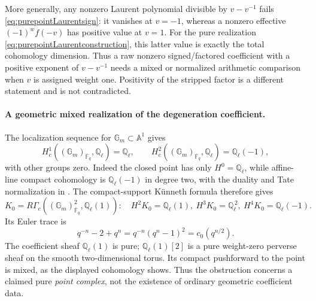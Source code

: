\documentclass[11pt,a4paper]{article}
\theoremstyle{named}\newtheorem{finding}{Finding}[section]
\theoremstyle{definition}\newtheorem{definition}[finding]{Definition}
\theoremstyle{remark}\newtheorem{remark}[finding]{Remark}
\begin{document}
More generally, any nonzero Laurent polynomial divisible by
\(v-v^{-1}\) fails \eqref{eq:purepointLaurentsign}:
it vanishes at \(v=-1\), whereas a nonzero effective
\((-1)^wf(-v)\) has positive value at \(v=1\).
For the pure realization
\eqref{eq:purepointLaurentconstruction}, this latter value
is exactly the total cohomology dimension.
Thus a raw nonzero signed/factored coefficient with a
positive exponent of \(v-v^{-1}\) needs a mixed or
normalized arithmetic comparison when \(v\) is assigned
weight one. Positivity of the stripped factor is a
different statement and is not contradicted.

\paragraph{A geometric mixed realization of the degeneration coefficient.}
The localization sequence for
\(\mathbb G_m\subset\mathbb A^1\)
\cite[Proposition~18.4(b), pp.~121--122]{Milne} gives
\[
 H_c^1((\mathbb G_m)_{\overline{\mathbb F}_q},
          \mathbb Q_\ell)=\mathbb Q_\ell,\qquad
 H_c^2((\mathbb G_m)_{\overline{\mathbb F}_q},
          \mathbb Q_\ell)=\mathbb Q_\ell(-1),
\]
with other groups zero. Indeed the closed point has
only \(H^0=\mathbb Q_\ell\), while affine-line compact
cohomology is \(\mathbb Q_\ell(-1)\) in degree two,
with the duality and Tate normalization in
\cite[Theorem~24.1(a),(b), p.~144]{Milne}.
The compact-support K\"unneth formula
\cite[Theorem~22.1 and Remark~22.3(b),
pp.~135--136]{Milne} therefore gives
\[
 K_0=R\Gamma_c((\mathbb G_m)^2_{\overline{\mathbb F}_q},
                   \mathbb Q_\ell(1)):
 \quad
 H^2K_0=\mathbb Q_\ell(1),\
 H^3K_0=\mathbb Q_\ell^{\,2},\
 H^4K_0=\mathbb Q_\ell(-1).
\]
Its Euler trace is
\[
                  q^{-n}-2+q^n
                  =q^{-n}(q^n-1)^2
                  =c_0(q^{n/2}).
\]
The coefficient sheaf \(\mathbb Q_\ell(1)\) is pure;
\(\mathbb Q_\ell(1)[2]\) is a pure weight-zero perverse
sheaf on the smooth two-dimensional torus.
Its compact pushforward to the point is mixed, as the
displayed cohomology shows. Thus the obstruction concerns
a claimed pure \emph{point complex}, not the existence
of ordinary geometric coefficient data.
\end{document}

